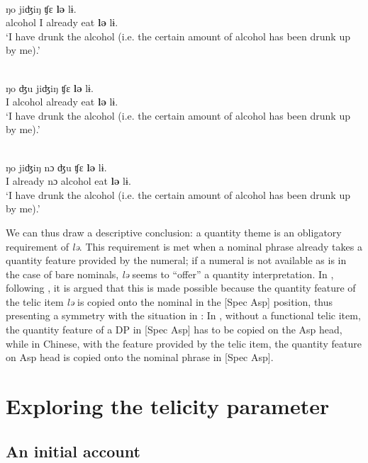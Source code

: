 \documentclass[output=paper]{langsci/langscibook}
\begin{document}
\begin{exe}
    \ex {}\\
      ŋo {jiʤiŋ} {ʧε} \textbf{lə} lɨ. \\
    alcohol I already eat \textbf{lə} lɨ. \\
    \glt \enquote*{I have drunk the alcohol (i.e. the certain amount of alcohol has been drunk up by me).}

    \ex {}\\
  \gll ŋo ʤu {jiʤiŋ} {ʧε} \textbf{lə} lɨ. \\
    I alcohol already eat \textbf{lə} lɨ. \\
    \glt \enquote*{I have drunk the alcohol (i.e. the certain amount of alcohol has been drunk up by me).}

\ex {}\\
   \gll ŋo {jiʤiŋ} {nɔ} ʤu {ʧε} \textbf{lə} lɨ. \\
    I already {nɔ} alcohol eat \textbf{lə} lɨ. \\
    \glt \enquote*{I have drunk the alcohol (i.e. the certain amount of alcohol has been drunk up by me).}
\end{exe}

We can thus draw a descriptive conclusion: a quantity theme is an obligatory
requirement of \emph{lə}. This requirement is met when a nominal phrase already
takes a quantity feature provided by the numeral; if a numeral is not available
as is in the case of bare nominals, \emph{lə} seems to ``offer'' a quantity
interpretation. In \textcite{Huxuhui2016}, following \textcite{Borer2005b}, it
is argued that this is made possible because the quantity feature of the telic
item \emph{lə} is copied onto the nominal in the [Spec Asp] position,
thus presenting a symmetry with the situation in : In , without a
functional telic item, the quantity feature of a DP in [Spec Asp] has to
be copied on the Asp head, while in Chinese, with the feature provided
by the telic item, the quantity feature on Asp head is copied onto the
nominal phrase in [Spec Asp].

\section{Exploring the telicity parameter}\label{sec:17.5}
\subsection{An initial account}
\end{document}

